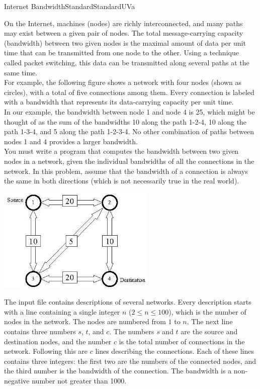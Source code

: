 \begin{problema}{Internet Bandwidth}{Standard}{Standard}{UVa} 


On the Internet, machines (nodes) are richly interconnected, and many paths may exist between a given pair of nodes. The total message-carrying capacity (bandwidth) between two given nodes is the maximal amount of data per unit time that can be transmitted from one node to the other. Using a technique called packet switching, this data can be transmitted along several paths at the same time. \\

For example, the following figure shows a network with four nodes (shown as circles), with a total of five connections among them. Every connection is labeled with a bandwidth that represents its data-carrying capacity per unit time.  \\

In our example, the bandwidth between node 1 and node 4 is 25, which might be thought of as the sum of the bandwidths 10 along the path 1-2-4, 10 along the path 1-3-4, and 5 along the path 1-2-3-4. No other combination of paths between nodes 1 and 4 provides a larger bandwidth. \\

You must write a program that computes the bandwidth between two given nodes in a network, given the individual bandwidths of all the connections in the network. In this problem, assume that the bandwidth of a connection is always the same in both directions (which is not necessarily true in the real world). \\ 


\begin{center}
\includegraphics[height=5cm]{Graficos/bandwidth}
\end{center}



\InputFile

The input file contains descriptions of several networks. Every description starts with a line containing a single integer $n$ ($2 \leq n \leq 100$), which is the number of nodes in the network. The nodes are numbered from $1$ to $n$. The next line contains three numbers $s$, $t$, and $c$. The numbers $s$ and $t$ are the source and destination nodes, and the number $c$ is the total number of connections in the network. Following this are $c$ lines describing the connections. Each of these lines contains three integers: the first two are the numbers of the connected nodes, and the third number is the bandwidth of the connection. The bandwidth is a non-negative number not greater than 1000. 


\end{problema}
